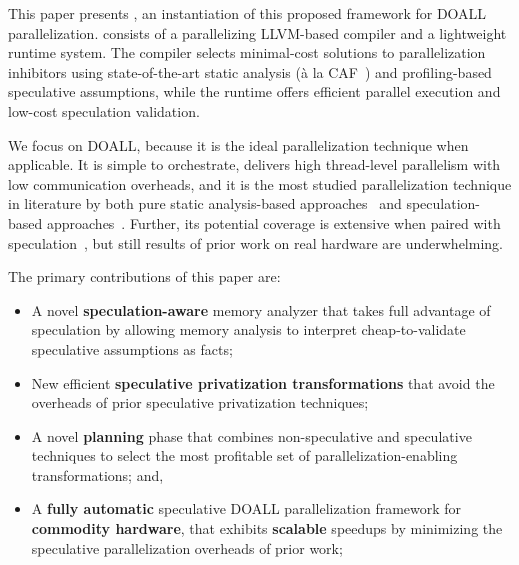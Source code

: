 %
%

This paper presents \name, an instantiation of this proposed framework for DOALL
parallelization. \name consists of a parallelizing LLVM-based compiler and a
lightweight
runtime system. The compiler selects minimal-cost solutions to parallelization
inhibitors using state-of-the-art static analysis (\`{a} la
CAF~\cite{johnson:cgo:17}) and profiling-based speculative assumptions, while
the runtime offers efficient parallel execution and low-cost speculation
validation.
%

We focus on DOALL, because it is the ideal parallelization technique when
applicable. It is simple to orchestrate, delivers high thread-level parallelism
with low communication overheads, and it is the most studied parallelization
technique in literature by both pure static analysis-based
approaches~\cite{..,.,..} and speculation-based approaches~\cite{..,..,..,..}.
Further, its potential coverage is extensive when paired with
speculation~\cite{zhong:08:hpca}, but still results of prior work on real
hardware are underwhelming.

The primary contributions of this paper are:
\begin{itemize}

\item A novel \textbf{speculation-aware} memory analyzer that takes
full advantage of speculation by allowing memory analysis to interpret
cheap-to-validate speculative assumptions as facts;

\item New efficient \textbf{speculative privatization transformations}
that avoid the overheads of prior speculative privatization
techniques;

\item A novel \textbf{planning} phase that combines non-speculative
and speculative techniques to select the most profitable set of
parallelization-enabling transformations; and,

\item A \textbf{fully automatic} speculative DOALL parallelization
framework for \textbf{commodity hardware}, that exhibits
\textbf{scalable} speedups by minimizing the speculative
parallelization overheads of prior work;

\end{itemize}

